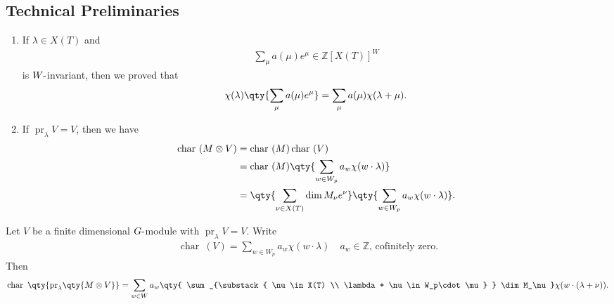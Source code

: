 \hypertarget{technical-preliminaries}{%
\subsection{Technical Preliminaries}\label{technical-preliminaries}}

\begin{enumerate}
\def\labelenumi{\arabic{enumi}.}
\item
  If \(\lambda \in X(T)\) and
  \begin{align*}         \sum_\mu a(\mu) e^\mu \in {\mathbb{Z}}[X(T)]^W       \end{align*}
  is \(W{\hbox{-}}\)invariant, then we proved that
  \begin{align*}         \chi(\lambda)       \qty{       \sum_\mu a(\mu) e^{\mu}       }       = \sum_\mu a(\mu) \chi(\lambda + \mu)       .\end{align*}
\item
  If \({\operatorname{pr}}_\lambda V = V\), then we have
  \begin{align*}       \operatorname{char}~(M\otimes V)      &= \operatorname{char}~(M) \operatorname{char}~(V) \\     &= \operatorname{char}~(M) \qty{\sum_{w\in W_p} a_w \chi(w\cdot\lambda) } \\     &= \qty{ \sum_{\nu \in X(T)} \dim M_\nu e^\nu } \qty{\sum_{w\in W_p} a_w \chi(w\cdot\lambda) }     .\end{align*}
\end{enumerate}

\begin{proposition}[?]

\begin{proposition}[?]

Let \(V\) be a finite dimensional \(G{\hbox{-}}\)module with
\({\operatorname{pr}}_\lambda V = V\). Write
\begin{align*}   \operatorname{char}~(V) = \sum_{w\in W_p} a_w \chi(w\cdot \lambda) \quad a_w\in {\mathbb{Z}},\, \text{cofinitely zero} .\end{align*}
Then
\begin{align*}   \operatorname{char}~\qty{{\operatorname{pr}}_\lambda \qty{ M\otimes V } } =  \sum_{w\in W} a_w  \qty{ \sum_{\substack{ \nu \in X(T) \\ \lambda + \nu \in W_p\cdot \mu} } \dim M_\nu } \chi(w\cdot (\lambda + \nu) ) .\end{align*}

\end{proposition}

\end{proposition}

